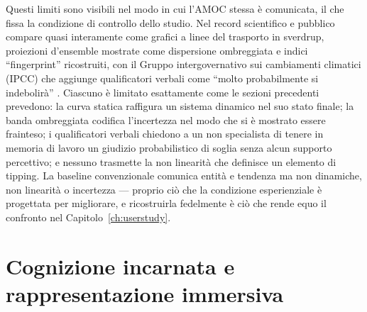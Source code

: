 Questi limiti sono visibili nel modo in cui l'AMOC stessa è comunicata, il che fissa la condizione di controllo dello studio. Nel record scientifico e pubblico compare quasi interamente come grafici a linee del trasporto in sverdrup, proiezioni d'ensemble mostrate come dispersione ombreggiata e indici ``fingerprint'' ricostruiti, con il Gruppo intergovernativo sui cambiamenti climatici (IPCC) che aggiunge qualificatori verbali come ``molto probabilmente si indebolirà'' \citep{caesar2018, ipcc2021}. Ciascuno è limitato esattamente come le sezioni precedenti prevedono: la curva statica raffigura un sistema dinamico nel suo stato finale; la banda ombreggiata codifica l'incertezza nel modo che si è mostrato essere frainteso; i qualificatori verbali chiedono a un non specialista di tenere in memoria di lavoro un giudizio probabilistico di soglia senza alcun supporto percettivo; e nessuno trasmette la non linearità che definisce un elemento di tipping. La baseline convenzionale comunica entità e tendenza ma non dinamiche, non linearità o incertezza --- proprio ciò che la condizione esperienziale è progettata per migliorare, e ricostruirla fedelmente è ciò che rende equo il confronto nel Capitolo~\ref{ch:userstudy}.

\section{Cognizione incarnata e rappresentazione immersiva}
\label{sec:embodied-viz}

